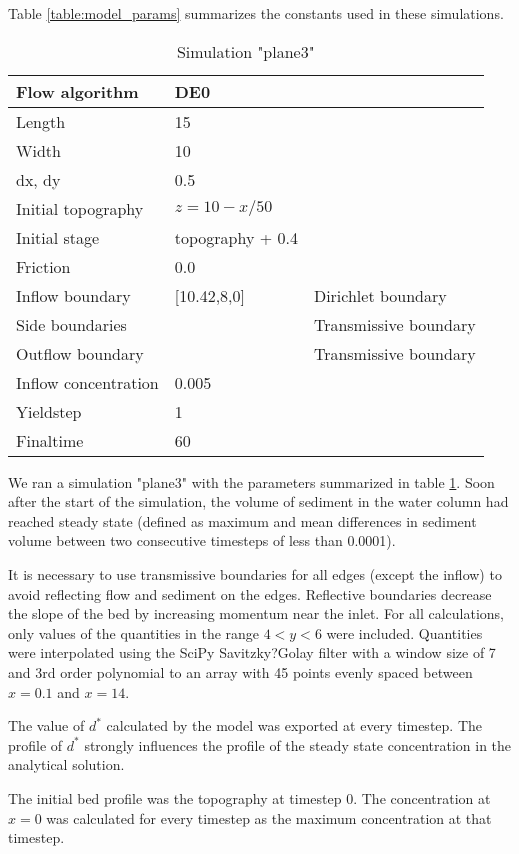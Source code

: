\documentclass[11pt]{article}
\begin{document}
Table \ref{table:model_params} summarizes the constants used in these simulations.



\begin{table}[]
\centering
\caption{Simulation "plane3"}
\label{table:plane3_params}
\begin{tabular}{|l|l|l|}
\hline
Flow algorithm       & DE0             &                       \\ \hline
Length               & 15              &                       \\ \hline
Width                & 10               &                       \\ \hline
dx, dy               & 0.5             &                       \\ \hline
Initial topography   & $z = 10 - x/50$ &                       \\ \hline
Initial stage        & topography + 0.4      &                       \\ \hline
Friction             & 0.0             &                       \\ \hline
Inflow boundary      & {[}10.42,8,0{]}    & Dirichlet boundary    \\ \hline
Side boundaries      &                 & Transmissive boundary   \\ \hline
Outflow boundary     &                 & Transmissive boundary \\ \hline
Inflow concentration & 0.005           &                       \\ \hline
Yieldstep            & 1               &                       \\ \hline
Finaltime            & 60              &                       \\ \hline
\end{tabular}
\end{table}


We ran a simulation "plane3" with the parameters summarized in table \ref{table:plane3_params}. Soon after the start of the simulation, the volume of sediment in the water column had reached steady state (defined as maximum and mean differences in sediment volume between two consecutive timesteps of less than 0.0001).

It is necessary to use transmissive boundaries for all edges (except the inflow) to avoid reflecting flow and sediment on the edges. Reflective boundaries decrease the slope of the bed by increasing momentum near the inlet. For all calculations, only values of the quantities in the range $4<y<6$ were included. Quantities were interpolated using the SciPy Savitzky?Golay filter with a window size of 7 and 3rd order polynomial to an array with 45 points evenly spaced between $x = 0.1$ and $x = 14$.

The value of $d^*$ calculated by the model was exported at every timestep. The profile of $d^*$ strongly influences the profile of the steady state concentration in the analytical solution.

The initial bed profile was the topography at timestep 0. The concentration at $x=0$ was calculated for every timestep as the maximum concentration at that timestep.
\end{document}
